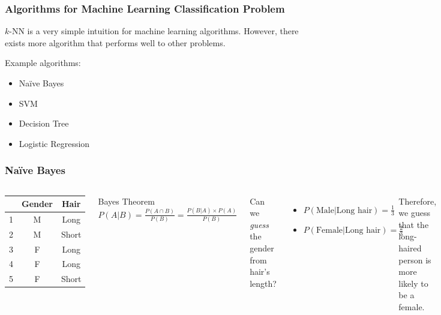 \documentclass[aspectratio=169]{beamer}
\begin{document}
\begin{frame}
	\frametitle{Algorithms for Machine Learning Classification Problem}
	$k$-NN is a very simple intuition for machine learning algorithms. However, there exists more algorithm that performs well to other problems.

	Example algorithms:
	\begin{itemize}
		\item Na\"{i}ve Bayes
		\item SVM
		\item Decision Tree
		\item Logistic Regression
	\end{itemize}
\end{frame}

\begin{frame}
	\frametitle{Na\"ive Bayes}
	\begin{columns}
		\begin{center}
			\begin{tabular}{|c | c c |}
				\hline
				  & Gender & Hair  \\ [0.5ex]
				\hline\hline
				1 & M      & Long  \\
				\hline
				2 & M      & Short \\
				\hline
				3 & F      & Long  \\
				\hline
				4 & F      & Long  \\
				\hline
				5 & F      & Short \\ [1ex]
				\hline
			\end{tabular}
		\end{center}
		\begin{block}{Bayes Theorem}
			$P(A|B) = \frac{P(A \cap B)}{P(B)} = \frac{P(B|A) \times P(A)}{P(B)}$
		\end{block}
		Can we \textit{guess} the gender from hair's length?
		\begin{itemize}
			\item $P(\textrm{Male}|\textrm{Long hair}) = \frac{1}{3}$
			\item $P(\textrm{Female}|\textrm{Long hair}) = \frac{2}{3}$
		\end{itemize}
		Therefore, we guess that the long-haired person is more likely to be a female.
	\end{columns}
\end{frame}
\end{document}
